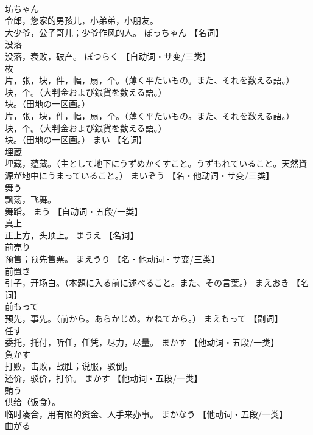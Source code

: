 \documentclass[8pt]{extreport}
\begin{document}
\begin{CJK}{UTF8}{min}
\\	坊ちゃん	
\\	令郎，您家的男孩儿，小弟弟，小朋友。 
\\	大少爷，公子哥儿；少爷作风的人。	ぼっちゃん		【名词】
\\	没落	
\\	没落，衰败，破产。	ぼつらく		【自动词・サ变/三类】
\\	枚	
\\	片，张，块，件，幅，扇，个。（薄く平たいもの。また、それを数える語。） 
\\	块，个。（大判金および銀貨を数える語。） 
\\	块。（田地の一区画。） 
\\	片，张，块，件，幅，扇，个。（薄く平たいもの。また、それを数える語。） 
\\	块，个。（大判金および銀貨を数える語。） 
\\	块。（田地の一区画。）	まい		【名词】
\\	埋蔵	
\\	埋藏，蕴藏。（主として地下にうずめかくすこと。うずもれていること。天然資源が地中にうまっていること。）	まいぞう		【名・他动词・サ变/三类】
\\	舞う	
\\	飘荡，飞舞。 
\\	舞蹈。	まう		【自动词・五段/一类】
\\	真上	
\\	正上方，头顶上。	まうえ		【名词】
\\	前売り	
\\	预售；预先售票。	まえうり		【名・他动词・サ变/三类】
\\	前置き	
\\	引子，开场白。（本題に入る前に述べること。また、その言葉。）	まえおき		【名词】
\\	前もって	
\\	预先，事先。（前から。あらかじめ。かねてから。）	まえもって		【副词】
\\	任す	
\\	委托，托付，听任，任凭，尽力，尽量。	まかす		【他动词・五段/一类】
\\	負かす	
\\	打败，击败，战胜；说服，驳倒。 
\\	还价，驳价，打价。	まかす		【他动词・五段/一类】
\\	賄う	
\\	供给（饭食）。 
\\	临时凑合，用有限的资金、人手来办事。	まかなう		【他动词・五段/一类】
\\	曲がる	

\end{CJK}
\end{document}
